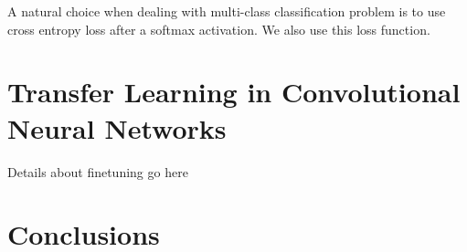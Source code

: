 \documentclass{article}
\begin{document}
A natural choice when dealing with multi-class classification problem is to use cross entropy loss after a softmax activation. We also use this loss function.

\section{Transfer Learning in Convolutional Neural Networks}

Details about finetuning go here 


\section{Conclusions}
 
{\small


}
\end{document}
